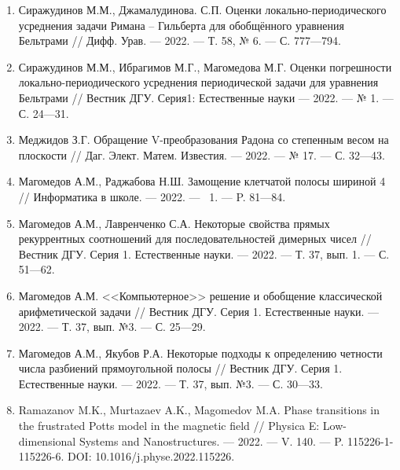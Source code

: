 \begin{enumerate}[1]

    \item
    Сиражудинов М.М., Джамалудинова. С.П.
    Оценки локально-периодического усреднения задачи Римана – Гильберта для обобщённого уравнения Бельтрами
    //
    Дифф. Урав.
    --- 2022.
    --- Т. 58, № 6.
    --- С. 777---794.

    \item
    Сиражудинов М.М., Ибрагимов М.Г., Магомедова М.Г.
    Оценки погрешности локально-периодического усреднения периодической задачи для уравнения Бельтрами
    //
    Вестник ДГУ. Серия1: Естественные науки
    --- 2022.
    --- № 1.
    --- С. 24---31.



    \item
    Меджидов З.Г.
    Обращение V-преобразования Радона со степенным весом на плоскости
    //
    Даг. Элект. Матем. Известия.
    --- 2022.
    --- № 17.
    --- С. 32---43.



    \item
    Магомедов А.М., Раджабова Н.Ш.
    Замощение клетчатой полосы шириной 4
    //
    Информатика в школе.
    --- 2022.
    --- \No\ 1.
    --- P. 81---84.

    \item
    Магомедов А.М., Лавренченко С.А.
    Некоторые свойства прямых рекуррентных соотношений для последовательностей димерных чисел
    //
    Вестник ДГУ. Серия 1. Естественные науки.
    --- 2022.
    --- Т. 37, вып. 1.
    --- С. 51---62.

    \item
    Магомедов А.М.
    <<Компьютерное>> решение и обобщение классической арифметической задачи
    //
    Вестник ДГУ. Серия 1. Естественные науки.
    --- 2022.
    --- Т. 37, вып. №3.
    --- С. 25---29.

    \item
    Магомедов А.М., Якубов Р.А.
    Некоторые подходы к определению четности числа разбиений прямоугольной полосы
    //
    Вестник ДГУ. Серия 1. Естественные науки.
    --- 2022.
    --- Т. 37, вып. №3.
    --- С. 30---33.



    \item
    Ramazanov M.K., Murtazaev A.K., Magomedov M.A.
    Phase transitions in the frustrated Potts model in the magnetic field
    //
    Physica E: Low-dimensional Systems and Nanostructures.
    --- 2022.
    --- V. 140.
    --- P. 115226-1-115226-6. DOI: 10.1016/j.physe.2022.115226.


\end{enumerate}
